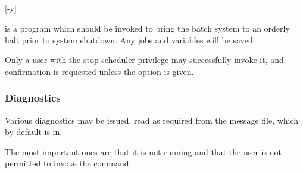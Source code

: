 \subsection{\BtquitName}

\begin{expara}

\BtquitName{} [-y]

\end{expara}

\PrBtquit{} is a program which should be invoked to bring the \ProductName{}
batch system to an orderly halt prior to system shutdown. Any jobs and variables will be saved.

Only a user with the stop scheduler privilege may successfully invoke it, and confirmation is requested unless the
 option is given.

\subsubsection{Diagnostics}
Various diagnostics may be issued, read as required from the message file, which by default is in\linebreak[30] .

The most important ones are that it is not running and that the user is not permitted to invoke the command.

